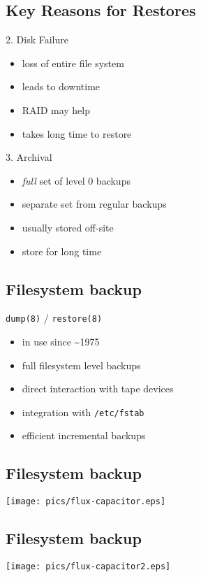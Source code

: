 \documentclass[xga]{xdvislides}
\begin{document}
\subsection{Key Reasons for Restores}
2. Disk Failure
\begin{itemize}
	\item loss of entire file system
	\item leads to downtime
	\item RAID may help
	\item takes long time to restore
\end{itemize}
\addvspace{.5in}
3. Archival
\begin{itemize}
	\item {\em full} set of level 0 backups
	\item separate set from regular backups
	\item usually stored off-site
	\item store for long time
\end{itemize}

\subsection{Filesystem backup}
{\tt dump(8)} / {\tt restore(8)}
\begin{itemize}
	\item in use since \~{}1975
	\item full filesystem level backups
	\item direct interaction with tape devices
	\item integration with {\tt /etc/fstab}
	\item efficient incremental backups
\end{itemize}

\subsection{Filesystem backup}
\vspace*{\fill}
\begin{center}
	\texttt{[image: pics/flux-capacitor.eps]}
\end{center}
\vspace*{\fill}

\subsection{Filesystem backup}
\vspace*{\fill}
\begin{center}
	\texttt{[image: pics/flux-capacitor2.eps]}
\end{center}
\vspace*{\fill}
\end{document}
